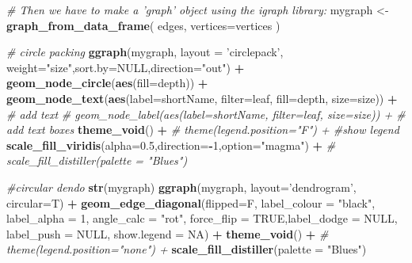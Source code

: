 \documentclass[10,portrait]{article}
\newenvironment{Shaded}{\begin{snugshade}}{\end{snugshade}}
\newcommand{\KeywordTok}[1]{\textcolor[rgb]{0.13,0.29,0.53}{\textbf{#1}}}
\newcommand{\DataTypeTok}[1]{\textcolor[rgb]{0.13,0.29,0.53}{#1}}
\newcommand{\DecValTok}[1]{\textcolor[rgb]{0.00,0.00,0.81}{#1}}
\newcommand{\FloatTok}[1]{\textcolor[rgb]{0.00,0.00,0.81}{#1}}
\newcommand{\StringTok}[1]{\textcolor[rgb]{0.31,0.60,0.02}{#1}}
\newcommand{\CommentTok}[1]{\textcolor[rgb]{0.56,0.35,0.01}{\textit{#1}}}
\newcommand{\OtherTok}[1]{\textcolor[rgb]{0.56,0.35,0.01}{#1}}
\newcommand{\OperatorTok}[1]{\textcolor[rgb]{0.81,0.36,0.00}{\textbf{#1}}}
\newcommand{\NormalTok}[1]{#1}
\begin{document}
\begin{Shaded}
\begin{Highlighting}[]
{{\CommentTok{# Then we have to make a 'graph' object using the igraph library:}
\NormalTok{mygraph <-}\StringTok{ }\KeywordTok{graph_from_data_frame}\NormalTok{( edges, }\DataTypeTok{vertices=}\NormalTok{vertices )}

\CommentTok{# circle packing}
\KeywordTok{ggraph}\NormalTok{(mygraph, }\DataTypeTok{layout =} \StringTok{'circlepack'}\NormalTok{, }\DataTypeTok{weight=}\StringTok{"size"}\NormalTok{,}\DataTypeTok{sort.by=}\OtherTok{NULL}\NormalTok{,}\DataTypeTok{direction=}\StringTok{"out"}\NormalTok{) }\OperatorTok{+}\StringTok{ }
\StringTok{  }\KeywordTok{geom_node_circle}\NormalTok{(}\KeywordTok{aes}\NormalTok{(}\DataTypeTok{fill=}\NormalTok{depth)) }\OperatorTok{+}
\StringTok{  }\KeywordTok{geom_node_text}\NormalTok{(}\KeywordTok{aes}\NormalTok{(}\DataTypeTok{label=}\NormalTok{shortName, }\DataTypeTok{filter=}\NormalTok{leaf, }\DataTypeTok{fill=}\NormalTok{depth, }\DataTypeTok{size=}\NormalTok{size)) }\OperatorTok{+}\StringTok{ }\CommentTok{# add text}
\StringTok{  }\CommentTok{# geom_node_label(aes(label=shortName, filter=leaf, size=size)) + # add text boxes}
\StringTok{  }\KeywordTok{theme_void}\NormalTok{() }\OperatorTok{+}\StringTok{ }
\StringTok{  }\CommentTok{# theme(legend.position="F") + #show legend}
\StringTok{  }\KeywordTok{scale_fill_viridis}\NormalTok{(}\DataTypeTok{alpha=}\FloatTok{0.5}\NormalTok{,}\DataTypeTok{direction=}\OperatorTok{-}\DecValTok{1}\NormalTok{,}\DataTypeTok{option=}\StringTok{"magma"}\NormalTok{) }\OperatorTok{+}
\StringTok{  }\CommentTok{# scale_fill_distiller(palette = "Blues")}

\CommentTok{#circular dendo}
\KeywordTok{str}\NormalTok{(mygraph)}
\KeywordTok{ggraph}\NormalTok{(mygraph, }\DataTypeTok{layout=}\StringTok{'dendrogram'}\NormalTok{, }\DataTypeTok{circular=}\NormalTok{T) }\OperatorTok{+}\StringTok{ }
\StringTok{  }\KeywordTok{geom_edge_diagonal}\NormalTok{(}\DataTypeTok{flipped=}\NormalTok{F,}
                     \DataTypeTok{label_colour =} \StringTok{"black"}\NormalTok{,}
                     \DataTypeTok{label_alpha =} \DecValTok{1}\NormalTok{,}
                     \DataTypeTok{angle_calc =} \StringTok{"rot"}\NormalTok{,}
                     \DataTypeTok{force_flip =} \OtherTok{TRUE}\NormalTok{,}\DataTypeTok{label_dodge =} \OtherTok{NULL}\NormalTok{, }\DataTypeTok{label_push =} \OtherTok{NULL}\NormalTok{, }
                     \DataTypeTok{show.legend =} \OtherTok{NA}\NormalTok{) }\OperatorTok{+}
\StringTok{  }\KeywordTok{theme_void}\NormalTok{() }\OperatorTok{+}
\StringTok{  }\CommentTok{# theme(legend.position="none") +}
\StringTok{  }\KeywordTok{scale_fill_distiller}\NormalTok{(}\DataTypeTok{palette =} \StringTok{"Blues"}\NormalTok{)}

}}
\end{Highlighting}
\end{Shaded}
\end{document}
